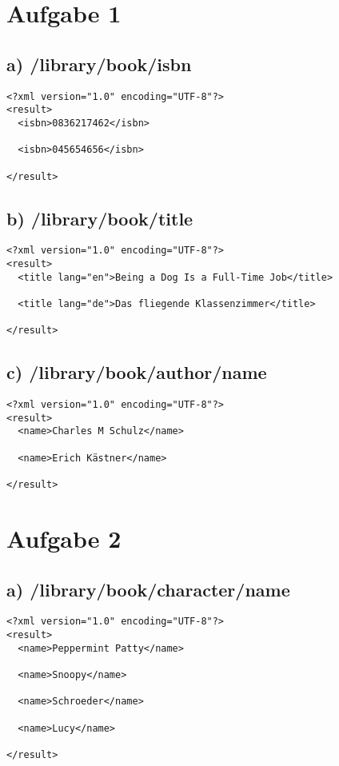 \documentclass{az_article}
\author{Andreas Zweili}
\date{\today}
\title{}
\begin{document}
\tableofcontents
    \newpage
    \section{Aufgabe 1}
\label{sec:orgd6ee63f}
\subsection{a) /library/book/isbn}
\label{sec:org6e4aeb4}
\begin{verbatim}
<?xml version="1.0" encoding="UTF-8"?>
<result>
  <isbn>0836217462</isbn>

  <isbn>045654656</isbn>

</result>
\end{verbatim}
\subsection{b) /library/book/title}
\label{sec:orgbe4ca90}
\begin{verbatim}
<?xml version="1.0" encoding="UTF-8"?>
<result>
  <title lang="en">Being a Dog Is a Full-Time Job</title>

  <title lang="de">Das fliegende Klassenzimmer</title>

</result>
\end{verbatim}
\subsection{c) /library/book/author/name}
\label{sec:orgef9b964}
\begin{verbatim}
<?xml version="1.0" encoding="UTF-8"?>
<result>
  <name>Charles M Schulz</name>

  <name>Erich Kästner</name>

</result>
\end{verbatim}
\section{Aufgabe 2}
\label{sec:org6bc604a}
\subsection{a) /library/book/character/name}
\label{sec:org01eaac0}
\begin{verbatim}
<?xml version="1.0" encoding="UTF-8"?>
<result>
  <name>Peppermint Patty</name>

  <name>Snoopy</name>

  <name>Schroeder</name>

  <name>Lucy</name>

</result>
\end{verbatim}
\end{document}
